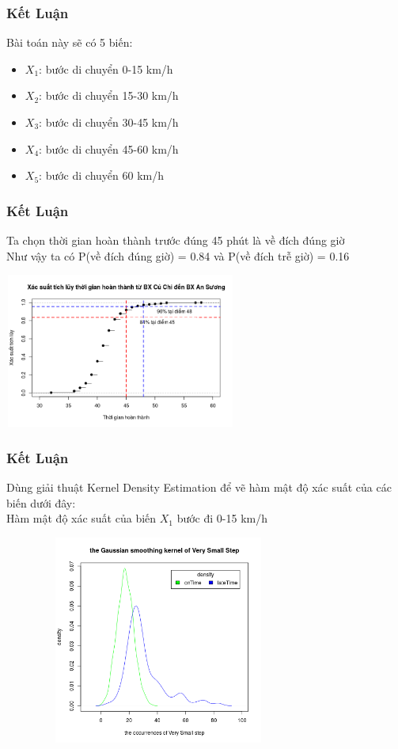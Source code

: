 \documentclass[t]{beamer}
\begin{document}

\begin{frame}
\frametitle{Kết Luận}
Bài toán này sẽ có 5 biến: 
\begin{itemize}
\item $X_1$: bước di chuyển 0-15 km/h
\item $X_2$: bước di chuyển 15-30 km/h
\item $X_3$: bước di chuyển 30-45 km/h
\item $X_4$: bước di chuyển 45-60 km/h
\item $X_5$: bước di chuyển 60 km/h
\end{itemize}
\end{frame}


\begin{frame}
\frametitle{Kết Luận}
Ta chọn thời gian hoàn thành trước đúng 45 phút là về đích đúng giờ\\
Như vậy ta có $\mathrm{P}$(về đích đúng giờ) = 0.84 và $\mathrm{P}$(về đích trễ giờ) = 0.16
\begin{center}
\includegraphics[height=2in,width=3in]{finishTime_CC_AS_ACC_Line}
\end{center}
\end{frame}

\begin{frame}
\frametitle{Kết Luận}
Dùng giải thuật Kernel Density Estimation để vẽ hàm mật độ xác suất của các biến dưới đây:\\
Hàm mật độ xác suất của biến $X_1$ bước đi 0-15 km/h
\begin{center}
\includegraphics[height=2.7in,width=4in]{DensityVerySmallStep.png}
\end{center}
\end{frame}
\end{document}

